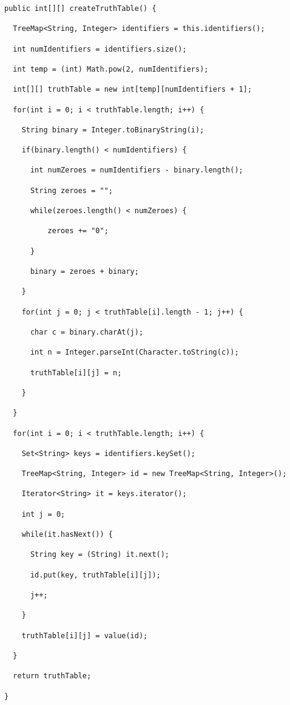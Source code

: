 \documentclass{report}
\begin{document}
\begin{lstlisting}



public int[][] createTruthTable() {

  TreeMap<String, Integer> identifiers = this.identifiers();

  int numIdentifiers = identifiers.size();

  int temp = (int) Math.pow(2, numIdentifiers);

  int[][] truthTable = new int[temp][numIdentifiers + 1];

  for(int i = 0; i < truthTable.length; i++) {

    String binary = Integer.toBinaryString(i);

    if(binary.length() < numIdentifiers) {

      int numZeroes = numIdentifiers - binary.length();

      String zeroes = "";

      while(zeroes.length() < numZeroes) {

	      zeroes += "0";

      }

      binary = zeroes + binary;

    }

    for(int j = 0; j < truthTable[i].length - 1; j++) {

      char c = binary.charAt(j);

      int n = Integer.parseInt(Character.toString(c));

      truthTable[i][j] = n;

    }

  }

  for(int i = 0; i < truthTable.length; i++) {

    Set<String> keys = identifiers.keySet();

    TreeMap<String, Integer> id = new TreeMap<String, Integer>();

    Iterator<String> it = keys.iterator();

    int j = 0;

    while(it.hasNext()) {

      String key = (String) it.next();

      id.put(key, truthTable[i][j]);

      j++;

    }

    truthTable[i][j] = value(id);

  }

  return truthTable;

}



\end{lstlisting}
\end{document}

